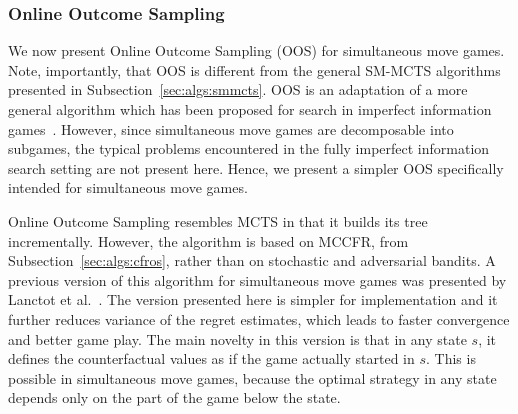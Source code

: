 \subsubsection{Online Outcome Sampling} \label{sec:oos}

We now present Online Outcome Sampling (OOS) for simultaneous move games. Note, importantly, that OOS is different from the general SM-MCTS
algorithms presented in Subsection~\ref{sec:algs:smmcts}. OOS is an adaptation of a more general
algorithm which has been proposed for search in imperfect information games~\cite{15aamas-iioos}. However, since simultaneous move games are
decomposable into subgames, the typical problems encountered in the fully imperfect information search setting are not present here. Hence, we present
a simpler OOS specifically intended for simultaneous move games.

Online Outcome Sampling resembles MCTS in that it builds its tree incrementally. However, the algorithm is based on MCCFR, from
Subsection~\ref{sec:algs:cfros}, rather than on stochastic and adversarial bandits.
A previous version of this algorithm for simultaneous move games was presented by Lanctot et al.~\cite{Lanctot13Goofspiel}. The version presented
here is simpler for implementation and it further reduces variance of the regret estimates, which leads to faster convergence and better game play.
The main novelty in this version is that in any state $s$, it defines the counterfactual values as if the game actually started in $s$. This is
possible in simultaneous move games, because the optimal strategy in any state depends only on the part of the game below the state.

